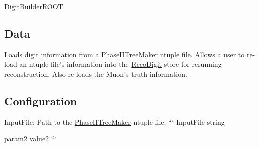 \hyperlink{classDigitBuilderROOT}{Digit\-Builder\-R\-O\-O\-T}

\subsection*{Data}

Loads digit information from a \hyperlink{classPhaseIITreeMaker}{Phase\-I\-I\-Tree\-Maker} ntuple file. Allows a user to re-\/load an ntuple file's information into the \hyperlink{classRecoDigit}{Reco\-Digit} store for rerunning reconstruction. Also re-\/loads the Muon's truth information.

\subsection*{Configuration}

Input\-File\-: Path to the \hyperlink{classPhaseIITreeMaker}{Phase\-I\-I\-Tree\-Maker} ntuple file. ``` Input\-File string

param2 value2 ``` 